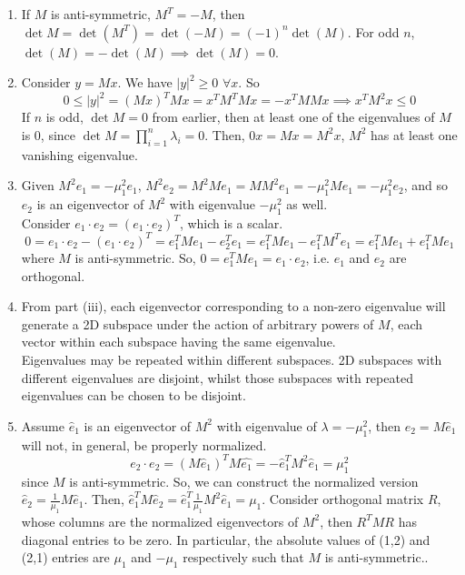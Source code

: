 \documentclass[a4paper]{article}
\begin{document}
\begin{ans}\leavevmode
\begin{enumerate}[label=(\roman*)]
\item If $M$ is anti-symmetric, $M^T=-M$, then $\det M=\det(M^T)=\det(-M)=(-1)^n\det(M)$. For odd $n$, $\det(M)=-\det(M)\implies\det(M)=0$.
\item Consider $y=Mx$. We have $|y|^2\geq0$ $\forall x$. So
$$0\leq|y|^2=(Mx)^TMx=x^TM^TMx=-x^TMMx\implies x^TM^2x\leq0$$
If $n$ is odd, $\det M=0$ from earlier, then at least one of the eigenvalues of $M$ is 0, since $\det M=\prod_{i=1}^n\lambda_i=0$. Then, $0x=Mx=M^2x$, $M^2$ has at least one vanishing eigenvalue.
\item Given $M^2e_1=-\mu_1^2e_1$, $M^2e_2=M^2Me_1=MM^2e_1=-\mu_1^2Me_1=-\mu_1^2e_2$, and so $e_2$ is an eigenvector of $M^2$ with eigenvalue $-\mu_1^2$ as well.\\[5pt]
Consider $e_1\cdot e_2=(e_1\cdot e_2)^T$, which is a scalar.
$$0=e_1\cdot e_2-(e_1\cdot e_2)^T=e_1^TMe_1-e_2^Te_1=e_1^TMe_1-e_1^TM^Te_1=e_1^TMe_1+e_1^TMe_1$$
where $M$ is anti-symmetric. So, $0=e_1^TMe_1=e_1\cdot e_2$, i.e. $e_1$ and $e_2$ are orthogonal.
\item From part (iii), each eigenvector corresponding to a non-zero eigenvalue will generate a 2D subspace under the action of arbitrary powers of $M$, each vector within each subspace having the same eigenvalue.\\[5pt]
Eigenvalues may be repeated within different subspaces. 2D subspaces with different eigenvalues are disjoint, whilst those subspaces with repeated eigenvalues can be chosen to be disjoint.
\item Assume $\hat{e}_1$ is an eigenvector of $M^2$ with eigenvalue of $\lambda=-\mu_1^2$, then $e_2=M\hat{e}_1$ will not, in general, be properly normalized.
$$e_2\cdot e_2=(M\hat{e}_1)^TM\hat{e_1}=-\hat{e}_1^TM^2\hat{e}_1=\mu_1^2$$
since $M$ is anti-symmetric. So, we can construct the normalized version $\hat{e}_2=\frac{1}{\mu_1}M\hat{e}_1$. Then, $\hat{e}_1^TM\hat{e}_2=\hat{e}_1^T\frac{1}{\mu_1}M^2\hat{e}_1=\mu_1$. Consider orthogonal matrix $R$, whose columns are the normalized eigenvectors of $M^2$, then $R^TMR$ has diagonal entries to be zero. In particular, the absolute values of (1,2) and (2,1) entries are $\mu_1$ and $-\mu_1$ respectively such that $M$ is anti-symmetric..
\end{enumerate}
\end{ans}
\newpage
\end{document}
